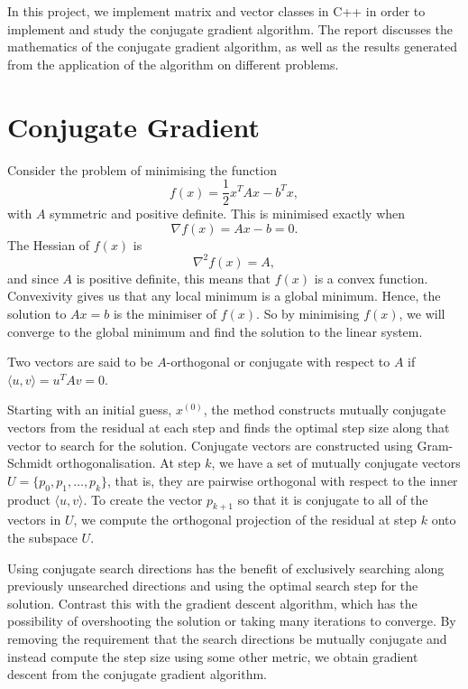 In this project, we implement matrix and vector classes in C++ in order to implement and study the conjugate gradient algorithm.
The report discusses the mathematics of the conjugate gradient algorithm, as well as the results generated from the application of the algorithm on different problems.


\section{Conjugate Gradient}
\label{sec:cg}

\iffalse
CG discussion:

Main algorithm
Mathematics of the mechanism
Preconditioning
Limitations of the algorithm
How do we get good/bad convergence?
Proof of convergence
Proof of complexity
\fi


Consider the problem of minimising the function
\[
    f(x) = \frac{1}{2} x^T A x - b^T x,
\]
with $A$ symmetric and positive definite. This is minimised exactly when 
\[
    \nabla f(x) = A x - b = 0.
\]
The Hessian of $f(x)$ is
\[
    \nabla^2 f(x) = A,
\]
and since $A$ is positive definite, this means that $f(x)$ is a convex function.
Convexivity gives us that any local minimum is a global minimum.
Hence, the solution to $Ax=b$ is the minimiser of $f(x)$.
So by minimising $f(x)$, we will converge to the global minimum and find the solution to the linear system.

Two vectors are said to be $A$-orthogonal or conjugate with respect to $A$ if $\langle u,v \rangle = u^T A v= 0$.

Starting with an initial guess, $x^{(0)}$, the method constructs mutually conjugate vectors from the residual at each step and finds the optimal step size along that vector to search for the solution.
Conjugate vectors are constructed using Gram-Schmidt orthogonalisation.
At step $k$, we have a set of mutually conjugate vectors $U=\{p_0, p_1,\ldots,p_k\}$, that is, they are pairwise orthogonal with respect to the inner product $\langle u,v \rangle$.
To create the vector $p_{k+1}$ so that it is conjugate to all of the vectors in $U$, we compute the orthogonal projection of the residual at step $k$ onto the subspace $U$.

Using conjugate search directions has the benefit of exclusively searching along previously unsearched directions and using the optimal search step for the solution.
Contrast this with the gradient descent algorithm, which has the possibility of overshooting the solution or taking many iterations to converge.
By removing the requirement that the search directions be mutually conjugate and instead compute the step size using some other metric, we obtain gradient descent from the conjugate gradient algorithm.

